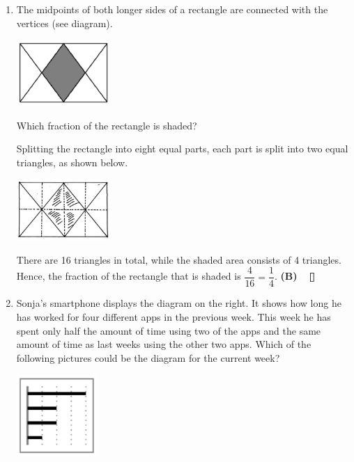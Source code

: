 \documentclass{report}
\begin{document}
\begin{multicols}{2}
\begin{enumerate}
        \item The midpoints of both longer sides of a rectangle are connected with the
              vertices (see diagram).
              \begin{center}
                  \includegraphics[width=0.28\textwidth]{pictures/4.png}
              \end{center}
              Which fraction of the rectangle is shaded?

              \sol{}

              Splitting the rectangle into eight equal parts, each part is split into two
              equal triangles, as shown below.
              \begin{center}
                  \includegraphics[width=0.28\textwidth]{pictures/5.png}
              \end{center}
              There are 16 triangles in total, while the shaded area consists of 4 triangles. Hence, the fraction of the rectangle that is shaded is $\dfrac{4}{16} = \dfrac{1}{4}$. \textbf{(B)} $\eos$

        \item Sonja's smartphone displays the diagram on the right. It shows how long he has
              worked for four different apps in the previous week. This week he has spent
              only half the amount of time using two of the apps and the same amount of time
              as last weeks using the other two apps. Which of the following pictures could
              be the diagram for the current week?
              \begin{center}
                  \includegraphics[width=0.24\textwidth]{pictures/6.png}
              \end{center}


\end{enumerate}
\end{multicols}
\end{document}
